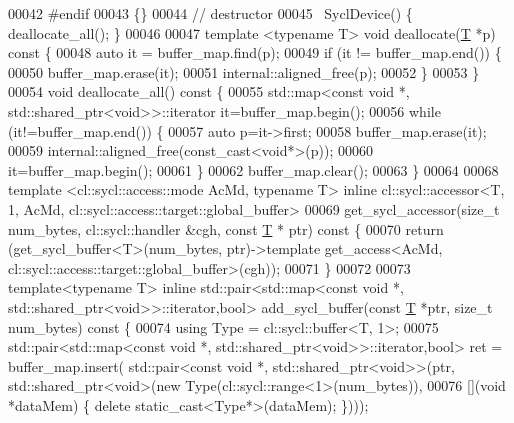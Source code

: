 \begin{DoxyCode}
00042 \textcolor{preprocessor}{#endif}
00043   \{\}
00044   \textcolor{comment}{// destructor}
00045   ~SyclDevice() \{ deallocate\_all(); \}
00046 
00047   \textcolor{keyword}{template} <\textcolor{keyword}{typename} T> \textcolor{keywordtype}{void} deallocate(\hyperlink{group___sparse_core___module_class_eigen_1_1_triplet}{T} *p)\textcolor{keyword}{ const }\{
00048     \textcolor{keyword}{auto} it = buffer\_map.find(p);
00049     \textcolor{keywordflow}{if} (it != buffer\_map.end()) \{
00050       buffer\_map.erase(it);
00051       internal::aligned\_free(p);
00052     \}
00053   \}
00054   \textcolor{keywordtype}{void} deallocate\_all()\textcolor{keyword}{ const }\{
00055     std::map<const void *, std::shared\_ptr<void>>::iterator it=buffer\_map.begin();
00056     \textcolor{keywordflow}{while} (it!=buffer\_map.end()) \{
00057       \textcolor{keyword}{auto} p=it->first;
00058       buffer\_map.erase(it);
00059       internal::aligned\_free(const\_cast<void*>(p));
00060       it=buffer\_map.begin();
00061     \}
00062     buffer\_map.clear();
00063   \}
00064 
00068   \textcolor{keyword}{template} <cl::sycl::access::mode AcMd, \textcolor{keyword}{typename} T> \textcolor{keyword}{inline} cl::sycl::accessor<T, 1, AcMd,
       cl::sycl::access::target::global\_buffer>
00069   get\_sycl\_accessor(\textcolor{keywordtype}{size\_t} num\_bytes, cl::sycl::handler &cgh, \textcolor{keyword}{const} \hyperlink{group___sparse_core___module_class_eigen_1_1_triplet}{T} * ptr)\textcolor{keyword}{ const }\{
00070     \textcolor{keywordflow}{return} (get\_sycl\_buffer<T>(num\_bytes, ptr)->\textcolor{keyword}{template} get\_access<AcMd,
       cl::sycl::access::target::global\_buffer>(cgh));
00071   \}
00072 
00073   \textcolor{keyword}{template}<\textcolor{keyword}{typename} T> \textcolor{keyword}{inline}  std::pair<std::map<const void *, std::shared\_ptr<void>>::iterator,\textcolor{keywordtype}{bool}> 
      add\_sycl\_buffer(\textcolor{keyword}{const} \hyperlink{group___sparse_core___module_class_eigen_1_1_triplet}{T} *ptr, \textcolor{keywordtype}{size\_t} num\_bytes)\textcolor{keyword}{ const }\{
00074     \textcolor{keyword}{using} Type = cl::sycl::buffer<T, 1>;
00075     std::pair<std::map<const void *, std::shared\_ptr<void>>::iterator,\textcolor{keywordtype}{bool}> ret = buffer\_map.insert(
      std::pair<\textcolor{keyword}{const} \textcolor{keywordtype}{void} *, std::shared\_ptr<void>>(ptr, std::shared\_ptr<void>(\textcolor{keyword}{new} Type(cl::sycl::range<1>(num\_bytes)),
00076       [](\textcolor{keywordtype}{void} *dataMem) \{ \textcolor{keyword}{delete} \textcolor{keyword}{static\_cast<}Type*\textcolor{keyword}{>}(dataMem); \})));

\end{DoxyCode}
